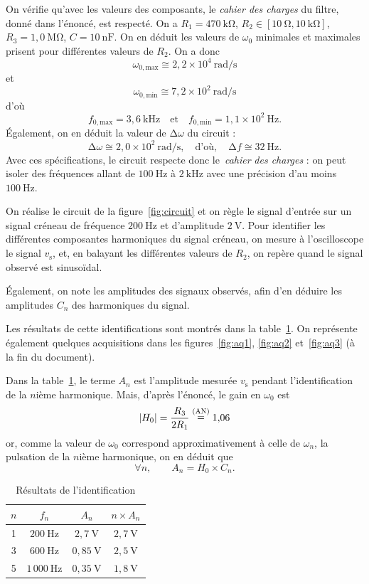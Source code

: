 \documentclass[a4paper,twocolumn]{article}
\begin{document}
	On vérifie qu'avec les valeurs des composants, le {\sl cahier des charges}\/ du filtre, donné dans l'énoncé, est respecté.
	On a $R_1 = 470\:\mathrm{k\Omega}$, $R_2 \in [10\:\mathrm{\Omega},10\:\mathrm{k\Omega}]$, $R_3 = 1{,}0\:\mathrm{M\Omega}$, $C = 10\:\mathrm{nF}$. On en déduit les valeurs de $\omega_0$\/ minimales et maximales prisent pour différentes valeurs de $R_2$. On a donc \[
		\omega_{0,\text{max}} \cong 2{,}2\times 10^4\:\mathrm{rad}/\mathrm{s}
	\] et \[
		\omega_{0,\text{min}} \cong 7{,}2\times 10^2\:\mathrm{rad}/\mathrm{s}
	\] d'où \[
		f_{0,\text{max}} = 3{,}6\:\mathrm{kHz}\quad\text{et}\quad f_{0,\text{min}} = 1{,}1\times 10^2\:\mathrm{Hz}
	.\]
	Également, on en déduit la valeur de $\mathrm{\Delta}\omega$\/ du circuit : \[
		\mathrm{\Delta}\omega \cong 2{,}0\times 10^{2}\:\mathrm{rad}/\mathrm{s},\quad\text{d'où},\quad \mathrm{\Delta}f \cong 32\:\mathrm{Hz}
	.\]
	Avec ces spécifications, le circuit respecte donc le~{\sl cahier} {\sl des charges}\/ : on peut isoler des fréquences allant de $100\:\mathrm{Hz}$\/ à $2\:\mathrm{kHz}$\/ avec une précision d'au moins $100\:\mathrm{Hz}$.

	On réalise le circuit de la figure~\ref{fig:circuit} et on règle le signal d'entrée sur un signal créneau de fréquence $200\:\mathrm{Hz}$\/ et d'amplitude $2\:\mathrm{V}$.
	Pour identifier les différentes composantes harmoniques du signal créneau, on mesure à l'oscilloscope le signal $v_\text{s}$, et, en balayant les différentes valeurs de $R_2$, on repère quand le signal observé est sinusoïdal.

	Également, on note les amplitudes des signaux observés, afin d'en déduire les amplitudes $C_n$\/ des harmoniques du signal.

	Les résultats de cette identifications sont montrés dans la table~\ref{tab:res}. On représente également quelques acquisitions dans les figures~\ref{fig:aq1}, \ref{fig:aq2} et~\ref{fig:aq3} (à la fin du document).

	Dans la table~\ref{tab:res}, le terme $A_n$\/ est l'amplitude mesurée $v_\text{s}$\/ pendant l'identification de la $n$ième harmonique.
	Mais, d'après l'énoncé, le gain en $\omega_0$\/ est \[
		|H_0| = \frac{R_3}{2R_1} \mathrel{\mathop=^{(\text{\sc AN})}} 1{,}06
	\] or, comme la valeur de $\omega_0$\/ correspond approximativement à celle de $\omega_n$, la pulsation de la $n$ième harmonique, on en déduit que \[
		\forall n,\qquad A_n = H_0\times C_n
	.\] 

	\begin{table}[H]
		\centering
		\begin{tabular}{|c|c|c|c|}
			\hline
			$n$&$f_n$&$A_n$&$n\times A_n$\\ \hline
			1&$200\:\mathrm{Hz}$&$2{,}7\:\mathrm{V}$&$2{,}7\:\mathrm{V}$\\
			3&$600\:\mathrm{Hz}$&$0{,}85\:\mathrm{V}$&$2{,}5\:\mathrm{V}$\\
			5&$1\,000\:\mathrm{Hz}$&$0{,}35\:\mathrm{V}$&$1{,}8\:\mathrm{V}$\\
			\hline
		\end{tabular}
		\caption{Résultats de l'identification}
		\label{tab:res}
	\end{table}
\end{document}
